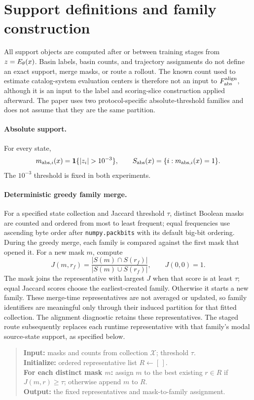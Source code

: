 \section{Support definitions and family construction}
\label{app:support_definitions}

All support objects are computed after or between training stages from \(z=E_\theta(x)\). Basin labels, basin counts, and trajectory assignments do not define an exact support, merge masks, or route a rollout. The known count used to estimate catalog-system evaluation centers is therefore not an input to \(F_{\rm abs}^{\rm align}\), although it is an input to the label and scoring-slice construction applied afterward. The paper uses two protocol-specific absolute-threshold families and does not assume that they are the same partition.

\paragraph{Absolute support.}
For every state,
\[
  m_{{\rm abs},i}(x)=\mathbf 1\{|z_i|>10^{-3}\},
  \qquad
  S_{\rm abs}(x)=\{i:m_{{\rm abs},i}(x)=1\}.
\]
The \(10^{-3}\) threshold is fixed in both experiments.

\paragraph{Deterministic greedy family merge.}
For a specified state collection and Jaccard threshold \(\tau\), distinct Boolean masks are counted and ordered from most to least frequent; equal frequencies use ascending byte order after \texttt{numpy.packbits} with its default big-bit ordering. During the greedy merge, each family is compared against the first mask that opened it. For a new mask \(m\), compute
\[
  J(m,r_f)=\frac{|S(m)\cap S(r_f)|}{|S(m)\cup S(r_f)|},
  \qquad J(0,0)=1.
\]
The mask joins the representative with largest \(J\) when that score is at least \(\tau\); equal Jaccard scores choose the earliest-created family. Otherwise it starts a new family. These merge-time representatives are not averaged or updated, so family identifiers are meaningful only through their induced partition for that fitted collection. The alignment diagnostic retains these representatives. The staged route subsequently replaces each runtime representative with that family's modal source-state support, as specified below.

\begin{quote}
\textbf{Input:} masks and counts from collection \(\mathcal X\); threshold \(\tau\).\\
\textbf{Initialize:} ordered representative list \(R\leftarrow[\,]\).\\
\textbf{For each distinct mask \(m\):} assign \(m\) to the best existing \(r\in R\) if \(J(m,r)\ge\tau\); otherwise append \(m\) to \(R\).\\
\textbf{Output:} the fixed representatives and mask-to-family assignment.
\end{quote}

